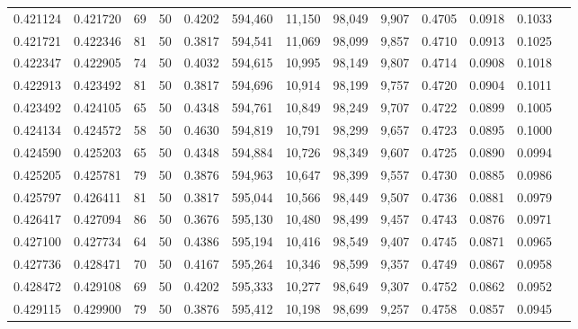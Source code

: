 \begin{tabular}{rrrrrrrrrrrrr}
0.421124 & 0.421720 &    69 &  50 &                                     0.4202 & 594,460 &  11,150 &  98,049 &   9,907 & 0.4705 & 0.0918 & 0.1033 \\
0.421721 & 0.422346 &    81 &  50 &                                     0.3817 & 594,541 &  11,069 &  98,099 &   9,857 & 0.4710 & 0.0913 & 0.1025 \\
0.422347 & 0.422905 &    74 &  50 &                                     0.4032 & 594,615 &  10,995 &  98,149 &   9,807 & 0.4714 & 0.0908 & 0.1018 \\
0.422913 & 0.423492 &    81 &  50 &                                     0.3817 & 594,696 &  10,914 &  98,199 &   9,757 & 0.4720 & 0.0904 & 0.1011 \\
0.423492 & 0.424105 &    65 &  50 &                                     0.4348 & 594,761 &  10,849 &  98,249 &   9,707 & 0.4722 & 0.0899 & 0.1005 \\
0.424134 & 0.424572 &    58 &  50 &                                     0.4630 & 594,819 &  10,791 &  98,299 &   9,657 & 0.4723 & 0.0895 & 0.1000 \\
0.424590 & 0.425203 &    65 &  50 &                                     0.4348 & 594,884 &  10,726 &  98,349 &   9,607 & 0.4725 & 0.0890 & 0.0994 \\
0.425205 & 0.425781 &    79 &  50 &                                     0.3876 & 594,963 &  10,647 &  98,399 &   9,557 & 0.4730 & 0.0885 & 0.0986 \\
0.425797 & 0.426411 &    81 &  50 &                                     0.3817 & 595,044 &  10,566 &  98,449 &   9,507 & 0.4736 & 0.0881 & 0.0979 \\
0.426417 & 0.427094 &    86 &  50 &                                     0.3676 & 595,130 &  10,480 &  98,499 &   9,457 & 0.4743 & 0.0876 & 0.0971 \\
0.427100 & 0.427734 &    64 &  50 &                                     0.4386 & 595,194 &  10,416 &  98,549 &   9,407 & 0.4745 & 0.0871 & 0.0965 \\
0.427736 & 0.428471 &    70 &  50 &                                     0.4167 & 595,264 &  10,346 &  98,599 &   9,357 & 0.4749 & 0.0867 & 0.0958 \\
0.428472 & 0.429108 &    69 &  50 &                                     0.4202 & 595,333 &  10,277 &  98,649 &   9,307 & 0.4752 & 0.0862 & 0.0952 \\
0.429115 & 0.429900 &    79 &  50 &                                     0.3876 & 595,412 &  10,198 &  98,699 &   9,257 & 0.4758 & 0.0857 & 0.0945 \\

\end{tabular}
